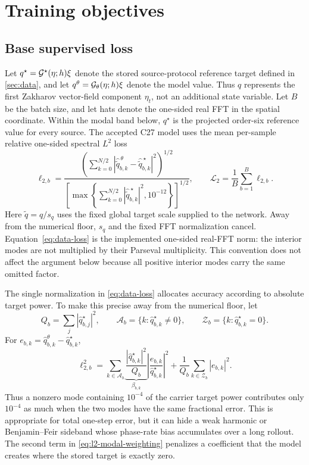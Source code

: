 \section{Training objectives}
\label{sec:hamiltonian-loss}

\subsection{Base supervised loss}

Let
$q^\star=\mathcal{G}^\star(\eta;h)\xi$ denote the stored source-protocol reference
target defined in \cref{sec:data}, and let
$q^\theta=\mathcal{G}_{\theta}(\eta;h)\xi$ denote the model value.  Thus $q$ represents
the first Zakharov vector-field component $\eta_t$, not an additional state
variable.  Let $B$ be the batch size, and let hats denote the one-sided real
FFT in the spatial coordinate.
Within the modal band below, $q^\star$ is the projected order-six reference
value for every source.  The accepted C27 model uses the mean per-sample
relative one-sided spectral $L^2$ loss
\begin{equation}
  \ell_{2,b}
  =\frac{\left(\sum_{k=0}^{N/2}
  |\widehat{\widetilde q}^{\,\theta}_{b,k}
   -\widehat{\widetilde q}^{\,\star}_{b,k}|^2\right)^{1/2}}
  {\left[\max\left\{
  \sum_{k=0}^{N/2}|\widehat{\widetilde q}^{\,\star}_{b,k}|^2,
  10^{-12}\right\}\right]^{1/2}},
  \qquad
  \mathcal L_2=\frac1B\sum_{b=1}^B\ell_{2,b}.
  \label{eq:data-loss}
\end{equation}
Here $\widetilde q=q/s_q$ uses the fixed global target scale supplied to the
network.  Away from the numerical floor, $s_q$ and the fixed FFT normalization
cancel.  Equation~\eqref{eq:data-loss} is the implemented one-sided real-FFT
norm: the interior modes are not multiplied by their Parseval multiplicity.
This convention does not affect the argument below because all positive
interior modes carry the same omitted factor.

The single normalization in \eqref{eq:data-loss} allocates accuracy according
to absolute target power.  To make this precise away from the numerical floor,
let
\begin{equation}
  Q_b=\sum_j|\widehat q_{b,j}^\star|^2,
  \qquad
  \mathcal A_b=\{k:\widehat q_{b,k}^\star\ne0\},
  \qquad
  \mathcal Z_b=\{k:\widehat q_{b,k}^\star=0\}.
\end{equation}
For $e_{b,k}=\widehat q_{b,k}^\theta-\widehat q_{b,k}^\star$,
\begin{equation}
  \ell_{2,b}^2
  =\sum_{k\in\mathcal A_b}
  \underbrace{\frac{|\widehat q_{b,k}^\star|^2}{Q_b}}
  _{\displaystyle \beta_{b,k}}
  \left|\frac{e_{b,k}}{\widehat q_{b,k}^\star}\right|^2
  +\frac1{Q_b}\sum_{k\in\mathcal Z_b}|e_{b,k}|^2.
  \label{eq:l2-modal-weighting}
\end{equation}
Thus a nonzero mode containing $10^{-4}$ of the carrier target power
contributes only $10^{-4}$ as much when the two modes have the same fractional
error.  This is
appropriate for total one-step error, but it can hide a weak harmonic or
Benjamin--Feir sideband whose phase-rate bias accumulates over a long rollout.
The second term in \eqref{eq:l2-modal-weighting} penalizes a coefficient that
the model creates where the stored target is exactly zero.

